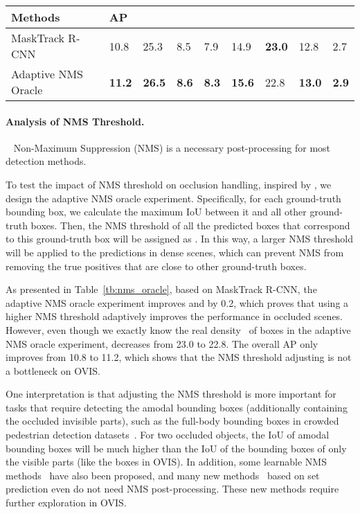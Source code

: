 \documentclass[twocolumn]{svjour3}          \smartqed  \usepackage{graphicx}
\def\myTextColor{\textcolor[rgb]{0, 0, 0}}
\begin{document}
\begin{sloppypar}
\begin{table*}
\centering
\begin{tabular}{|l|p{0.48cm}<{\centering}p{0.48cm}<{\centering}p{0.57cm}<{\centering}p{0.48cm}<{\centering}p{0.6cm}<{\centering}|p{0.6cm}<{\centering}p{0.6cm}<{\centering}p{0.6cm}<{\centering}|}
\hline
Methods & AP  &   &   &   &  &   &   &  \\
\hline
\hline
MaskTrack R-CNN & 10.8 & 25.3 & 8.5 & 7.9 & 14.9 & \textbf{23.0} & 12.8 & 2.7 \\
 Adaptive NMS~\cite{adaptivenms} Oracle & \textbf{11.2} & \textbf{26.5} & \textbf{8.6} & \textbf{8.3} & \textbf{15.6} & 22.8 & \textbf{13.0} & \textbf{2.9} \\
\hline
\end{tabular}
\caption{\myTextColor{Adaptive NMS oracle results of MaskTrack R-CNN on OVIS.}}
\label{tb:nms_oracle}
\end{table*}

\paragraph{\myTextColor{Analysis of NMS Threshold.}}~\myTextColor{
Non-Maximum Suppression (NMS) is a necessary post-processing for most detection methods.}
    
\myTextColor{
To test the impact of NMS threshold on occlusion handling, inspired by \cite{adaptivenms}, we design the adaptive NMS oracle experiment. Specifically, for each ground-truth bounding box, we calculate the maximum IoU  between it and all other ground-truth boxes. Then, the NMS threshold of all the predicted boxes that correspond to this ground-truth box will be assigned as . In this way, a larger NMS threshold will be applied to the predictions in dense scenes, which can prevent NMS from removing the true positives that are close to other ground-truth boxes.}

\myTextColor{
As presented in Table~\ref{tb:nms_oracle}, based on MaskTrack R-CNN, the adaptive NMS oracle experiment improves  and  by 0.2, which proves that using a higher NMS threshold adaptively improves the performance in occluded scenes. However, even though we exactly know the real density~\cite{adaptivenms} of boxes in the adaptive NMS oracle experiment,  decreases from 23.0 to 22.8. The overall AP only improves from 10.8 to 11.2, which shows that the NMS threshold adjusting is not a bottleneck on OVIS.}

\myTextColor{
One interpretation is that adjusting the NMS threshold is more important for tasks that require detecting the amodal bounding boxes (additionally containing the occluded invisible parts), such as the full-body bounding boxes in crowded pedestrian detection datasets~\cite{citypersons,crowdhuman}. For two occluded objects, the IoU of amodal bounding boxes will be much higher than the IoU of the bounding boxes of only the visible parts (like the boxes in OVIS). In addition, some learnable NMS methods~\cite{learnablenms,adaptivenms} have also been proposed, and many new methods~\cite{detr,queryinst} based on set prediction even do not need NMS post-processing. These new methods require further exploration in OVIS.}




\end{sloppypar}
\end{document}
